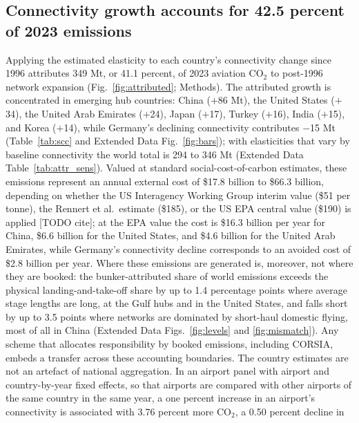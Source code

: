 \documentclass[12pt]{article}
\begin{document}
\begin{table}[H]
{\begin{threeparttable}
\begin{tablenotes}[flushleft]
\end{tablenotes}
\end{threeparttable}}
\end{table}

\subsection*{Connectivity growth accounts for 42.5 percent of 2023
emissions}
Applying the estimated elasticity to each country's connectivity change
since 1996 attributes 349 Mt, or 41.1 percent, of 2023 aviation CO$_2$ to
post-1996 network expansion (Fig.~\ref{fig:attributed}; Methods). The
attributed growth is concentrated in emerging hub countries: China
($+$86 Mt), the United States ($+$34), the United Arab Emirates ($+$24), Japan ($+$17), Turkey ($+$16), India ($+$15), and Korea ($+$14), while
Germany's declining connectivity contributes $-$15 Mt (Table~\ref{tab:scc} and Extended Data Fig.~\ref{fig:bars}); with elasticities that vary by baseline connectivity the world total is 294 to 346 Mt (Extended Data Table~\ref{tab:attr_sens}). Valued at standard social-cost-of-carbon estimates,
these emissions represent an annual external cost of \$17.8 billion to
\$66.3 billion, depending on whether the US Interagency Working Group
interim value (\$51 per tonne), the Rennert et al.\ estimate (\$185), or
the US EPA central value (\$190) is applied [TODO cite]; at the EPA value
the cost is \$16.3 billion per year for China, \$6.6 billion for the
United States, and \$4.6 billion for the United Arab Emirates, while
Germany's connectivity decline corresponds to an avoided cost of \$2.8
billion per year. Where these
emissions are generated is, moreover, not where they are booked: the
bunker-attributed share of world emissions exceeds the physical
landing-and-take-off share by up to 1.4 percentage points where average
stage lengths are long, at the Gulf hubs and in the United States, and
falls short by up to 3.5 points where networks are dominated by
short-haul domestic flying, most of all in China (Extended Data
Figs.~\ref{fig:levels} and \ref{fig:mismatch}). Any scheme that allocates
responsibility by booked emissions, including CORSIA, embeds a transfer
across these accounting boundaries. The country estimates are not an artefact of national aggregation.
In an airport panel with airport and country-by-year fixed effects, so
that airports are compared with other airports of the same country in the
same year, a one percent increase in an airport's connectivity is
associated with 3.76 percent more CO$_2$, a 0.50 percent decline in
\end{document}
